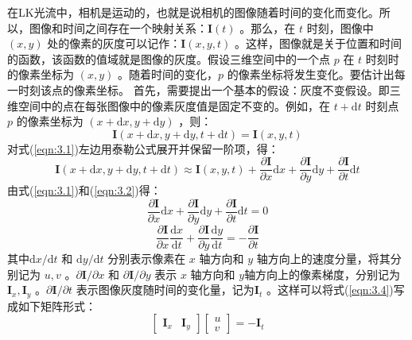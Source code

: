 在LK光流中，相机是运动的，也就是说相机的图像随着时间的变化而变化。所以，图像和时间之间存在一个映射关系：$\bm{I}(t) $ 。那么，在 $t$ 时刻，图像中 $(x,y)$ 处的像素的灰度可以记作：$ \boldsymbol{I}(x, y, t) $ 。这样，图像就是关于位置和时间的函数，该函数的值域就是图像的灰度。假设三维空间中的一个点 $p$ 在 $t$  时刻时的像素坐标为 $(x,y)$ 。随着时间的变化，$p$ 的像素坐标将发生变化。要估计出每一时刻该点的像素坐标。
首先，需要提出一个基本的假设：灰度不变假设。即三维空间中的点在每张图像中的像素灰度值是固定不变的。例如，在 $t+\mathrm{d} t $ 时刻点  $p$ 的像素坐标为 $(x+\mathrm{d} x, y+\mathrm{d} y) $ ，则：
\begin{equation}
\label{eqn:3.1}
\boldsymbol{I}(x+\mathrm{d} x, y+\mathrm{d} y, t+\mathrm{d} t)=\boldsymbol{I}(x, y, t)
\end{equation}
对式(\ref{eqn:3.1})左边用泰勒公式展开并保留一阶项，得：
\begin{equation}
\label{eqn:3.2}
\boldsymbol{I}(x+\mathrm{d} x, y+\mathrm{d} y, t+\mathrm{d} t) \approx \boldsymbol{I}(x, y, t)+\frac{\partial \boldsymbol{I}}{\partial x} \mathrm{d} x+\frac{\partial \boldsymbol{I}}{\partial y} \mathrm{d} y+\frac{\partial \boldsymbol{I}}{\partial t} \mathrm{d} t
\end{equation}
由式(\ref{eqn:3.1})和(\ref{eqn:3.2})得：
\begin{equation}
\label{eqn:3.3}
\frac{\partial \boldsymbol{I}}{\partial x} \mathrm{d} x+\frac{\partial \boldsymbol{I}}{\partial y} \mathrm{d} y+\frac{\partial \boldsymbol{I}}{\partial t} \mathrm{d} t=0
\end{equation}
\begin{equation}
\label{eqn:3.4}
\frac{\partial \boldsymbol{I}}{\partial x} \frac{\mathrm{d} x}{\mathrm{d} t}+\frac{\partial \boldsymbol{I}}{\partial y} \frac{\mathrm{d} y}{\mathrm{d} t}=-\frac{\partial \boldsymbol{I}}{\partial t}
\end{equation}
其中$\mathrm{d} x / \mathrm{d} t $ 和 $\mathrm{d} y / \mathrm{d} t $ 分别表示像素在 $x$ 轴方向和 $y$ 轴方向上的速度分量，将其分别记为 $u, v $ 。$\partial \boldsymbol{I} / \partial x $ 和 $\partial \boldsymbol{I} / \partial y $ 表示 $x$ 轴方向和 $y$轴方向上的像素梯度，分别记为 $\boldsymbol{I}_{x}, \boldsymbol{I}_{y} $ 。$\partial \boldsymbol{I} / \partial t $ 表示图像灰度随时间的变化量，记为$\boldsymbol{I}_{t} $ 。这样可以将式(\ref{eqn:3.4})写成如下矩阵形式：
\begin{equation}
\label{eqn:3.5}
\left[ \begin{array}{ll}{\boldsymbol{I}_{x}} & {\boldsymbol{I}_{y}}\end{array}\right] \left[ \begin{array}{l}{u} \\ {v}\end{array}\right]=-\boldsymbol{I}_{t}
\end{equation}

